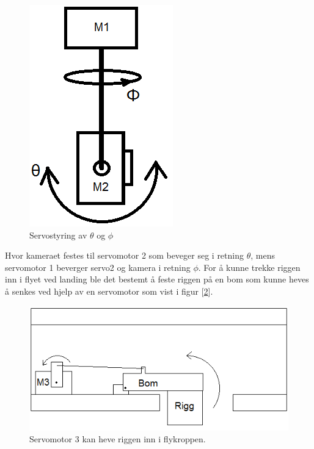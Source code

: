\begin{figure}[h!]
	\centering
	\includegraphics[scale=0.5]{img/BasicRiggIde.png}
	\caption{Servostyring av $\theta$ og $\phi$}
	\label{fig:IdeRigg}
\end{figure}

Hvor kameraet festes til servomotor 2 som beveger seg i retning $\theta$, mens servomotor 1 beverger servo2 og kamera i retning $\phi$. For å kunne trekke riggen inn i flyet ved landing ble det bestemt å feste riggen på en bom som kunne heves å senkes ved hjelp av en servomotor som vist i figur [\ref{fig:bom}].

\begin{figure}[h!]
	\centering
	\includegraphics[scale=0.5]{img/Motor3.png}
	\caption{Servomotor 3 kan heve riggen inn i flykroppen.}
	\label{fig:bom}
\end{figure}


